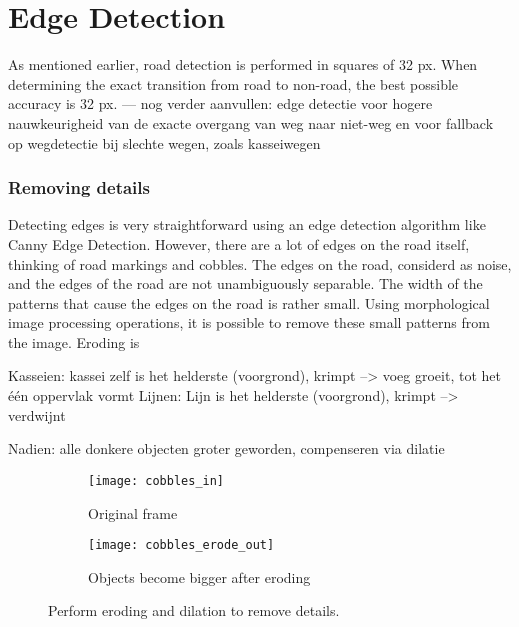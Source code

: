 \chapter{Edge Detection}

As mentioned earlier, road detection is performed in squares of 32 px. When determining the exact transition from road to non-road, the best possible accuracy is 32 px. 
\npar --- nog verder aanvullen: edge detectie voor hogere nauwkeurigheid van de exacte overgang van weg naar niet-weg en voor fallback op wegdetectie bij slechte wegen, zoals kasseiwegen 

\subsection{Removing details}

Detecting edges is very straightforward using an edge detection algorithm like Canny Edge Detection. However, there are a lot of edges on the road itself, thinking of road markings and cobbles. The edges on the road, considerd as noise, and the edges of the road are not unambiguously separable. The width of the patterns that cause the edges on the road is rather small. Using morphological image processing operations, it is possible to remove these small patterns from the image.  
\npar
Eroding is

Kasseien: kassei zelf is het helderste (voorgrond),  krimpt --> voeg groeit, tot het één oppervlak vormt
Lijnen: Lijn is het helderste (voorgrond), krimpt --> verdwijnt

Nadien: alle donkere objecten groter geworden, compenseren via dilatie

\begin{figure}[ht]
\centering
\begin{subfigure}{.5\textwidth}
  \centering
  \texttt{[image: cobbles\_in]}
  \caption{Original frame\label{zebra_orig}}
\end{subfigure}%
\begin{subfigure}{.5\textwidth}
  \centering
  \texttt{[image: cobbles\_erode\_out]}
  \caption{Objects become bigger after eroding\label{zebrawitcanny}}
\end{subfigure}
\caption{Perform eroding and dilation to remove details.}
\end{figure}


